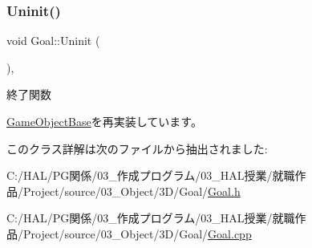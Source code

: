\mbox{\label{class_goal_a48126385a674bcda855e2a61561fbf9f}} 
\subsubsection{\texorpdfstring{Uninit()}{Uninit()}}
{\footnotesize\ttfamily void Goal\+::\+Uninit (\begin{DoxyParamCaption}{ }\end{DoxyParamCaption})\hspace{0.3cm}{\ttfamily [override]}, {\ttfamily [virtual]}}



終了関数 



\mbox{\hyperlink{class_game_object_base_a97e1bc277d7b1c0156d4735de29a022c}{Game\+Object\+Base}}を再実装しています。



このクラス詳解は次のファイルから抽出されました\+:\begin{DoxyCompactItemize}
\item 
C\+:/\+H\+A\+L/\+P\+G関係/03\+\_\+作成プログラム/03\+\_\+\+H\+A\+L授業/就職作品/\+Project/source/03\+\_\+\+Object/3\+D/\+Goal/\mbox{\hyperlink{_goal_8h}{Goal.\+h}}\item 
C\+:/\+H\+A\+L/\+P\+G関係/03\+\_\+作成プログラム/03\+\_\+\+H\+A\+L授業/就職作品/\+Project/source/03\+\_\+\+Object/3\+D/\+Goal/\mbox{\hyperlink{_goal_8cpp}{Goal.\+cpp}}\end{DoxyCompactItemize}
